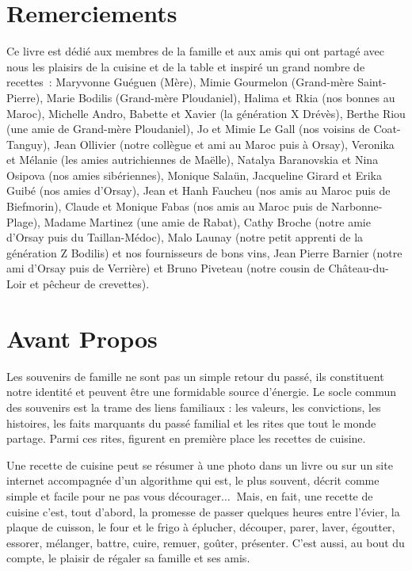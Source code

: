 


\section*{Remerciements}
Ce livre est dédié aux membres de la famille et aux amis qui ont partagé avec nous les plaisirs de la cuisine et de la table et inspiré un grand nombre de recettes :
Maryvonne Guéguen (Mère), Mimie Gourmelon (Grand-mère Saint-Pierre), Marie Bodilis (Grand-mère Ploudaniel), Halima et Rkia (nos  bonnes au Maroc),  Michelle Andro, Babette et Xavier (la génération X Drévès), Berthe Riou (une amie de  Grand-mère Ploudaniel), Jo et Mimie Le Gall (nos voisins de Coat-Tanguy), Jean Ollivier (notre collègue et ami au Maroc puis à Orsay), Veronika et Mélanie (les amies autrichiennes de Maëlle), Natalya Baranovskia et Nina Osipova (nos amies sibériennes), Monique Salaün, Jacqueline Girard et Erika Guibé (nos amies d’Orsay), Jean et Hanh Faucheu (nos amis au Maroc puis de Biefmorin), Claude et Monique Fabas (nos amis au Maroc puis de Narbonne-Plage), Madame Martinez (une amie de Rabat), Cathy Broche (notre amie d’Orsay puis du Taillan-Médoc), Malo Launay (notre petit apprenti de la génération Z Bodilis) et nos fournisseurs de bons vins, Jean Pierre Barnier (notre ami d’Orsay puis de Verrière) et Bruno Piveteau (notre cousin de Château-du-Loir et pêcheur de crevettes).
\newpage
\ %
\newpage

\section*{Avant Propos}
Les souvenirs de famille ne sont pas un simple retour du passé, ils constituent notre identité et peuvent être une formidable source d’énergie. Le socle commun des souvenirs est la trame des liens familiaux : les valeurs, les convictions, les histoires, les faits marquants du passé familial et les rites que tout le monde partage. Parmi ces rites, figurent en première place les recettes de cuisine.

Une recette de cuisine peut se résumer à une photo dans un livre ou sur un site internet accompagnée d’un algorithme qui est, le plus souvent, décrit comme simple et facile pour ne pas vous décourager$\ldots~$ Mais, en fait, une recette de cuisine c’est, tout d'abord, la promesse de passer quelques heures entre l’évier, la plaque de cuisson, le four et le frigo à éplucher, découper, parer, laver, égoutter, essorer, mélanger, battre, cuire, remuer, goûter, présenter.
C'est aussi, au bout du compte, le plaisir de régaler sa famille et ses amis.

